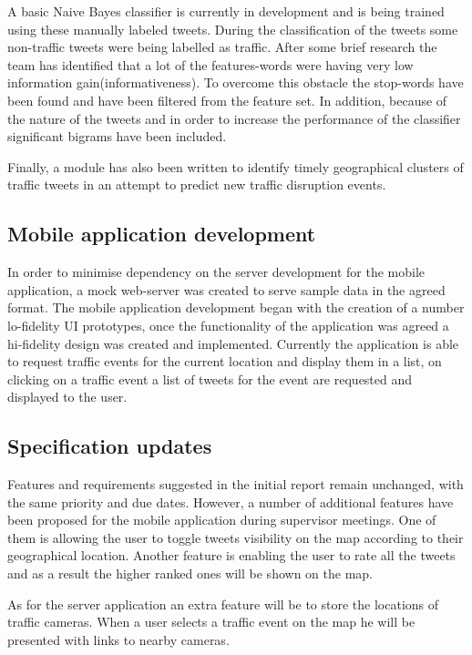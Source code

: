 A basic Naive Bayes classifier is currently in development and is being trained
using these manually labeled tweets. During the classification  of the tweets
some non-traffic tweets were being labelled as traffic. After some brief
research the team has identified that a lot of the features-words were having
very low information gain(informativeness). To overcome this obstacle the
stop-words have been found and have been filtered from the feature set. In
addition, because of the nature of the tweets and in order to increase the
performance of the classifier significant bigrams have been included. 

Finally, a module has also been written to identify timely geographical
clusters of traffic tweets in an attempt to predict new traffic disruption
events. 


\subsection{Mobile application development}

In order to minimise dependency on the server development for the mobile
application, a  mock web-server was created to serve sample data in the agreed
format. The mobile application development began with the creation of a number
lo-fidelity UI prototypes, once the functionality of the application was agreed
a hi-fidelity design was created and implemented. Currently the application is
able to request traffic events for the current location and display them in a
list, on clicking on a traffic event a list of tweets for the event are
requested and displayed to the user. 

\subsection{Specification updates}

Features and requirements suggested in the initial report remain unchanged,
with the same priority and due dates. However, a number of additional features
have been proposed for the mobile application during supervisor meetings. One
of them is allowing the user to toggle tweets visibility on the map according
to their geographical location. Another feature is enabling the user to rate
all the tweets and as a result the higher ranked ones will be shown on the map.

As for the server application an extra feature will be to store the locations
of traffic cameras. When a user selects a traffic event on the map he will be
presented with links to nearby cameras.



